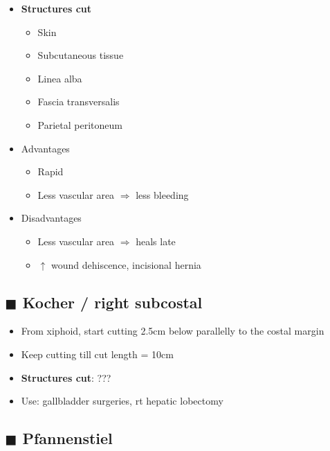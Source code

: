 \documentclass[
  14pt,
]{memoir}
\providecommand{\tightlist}{%
  \setlength{\itemsep}{0pt}\setlength{\parskip}{0pt}}
\begin{document}
\begin{itemize}
\tightlist
\item
  \textbf{Structures cut}

  \begin{itemize}
  \tightlist
  \item
    Skin
  \item
    Subcutaneous tissue
  \item
    Linea alba
  \item
    Fascia transversalis
  \item
    Parietal peritoneum
  \end{itemize}
\item
  Advantages

  \begin{itemize}
  \tightlist
  \item
    Rapid
  \item
    Less vascular area \(\Rightarrow\) less bleeding
  \end{itemize}
\item
  Disadvantages

  \begin{itemize}
  \tightlist
  \item
    Less vascular area \(\Rightarrow\) heals late
  \item
    \(\uparrow\) wound dehiscence, incisional hernia
  \end{itemize}
\end{itemize}

\hypertarget{blacksquare-kocher-right-subcostal}{%
\subsection{\texorpdfstring{\(\blacksquare\) Kocher / right
subcostal}{\textbackslash blacksquare Kocher / right subcostal}}\label{blacksquare-kocher-right-subcostal}}

\begin{itemize}
\tightlist
\item
  From xiphoid, start cutting 2.5cm below parallelly to the costal
  margin
\item
  Keep cutting till cut length = 10cm
\item
  \textbf{Structures cut}: ???
\item
  Use: gallbladder surgeries, rt hepatic lobectomy
\end{itemize}

\hypertarget{blacksquare-pfannenstiel}{%
\subsection{\texorpdfstring{\(\blacksquare\)
Pfannenstiel}{\textbackslash blacksquare Pfannenstiel}}\label{blacksquare-pfannenstiel}}
\end{document}
